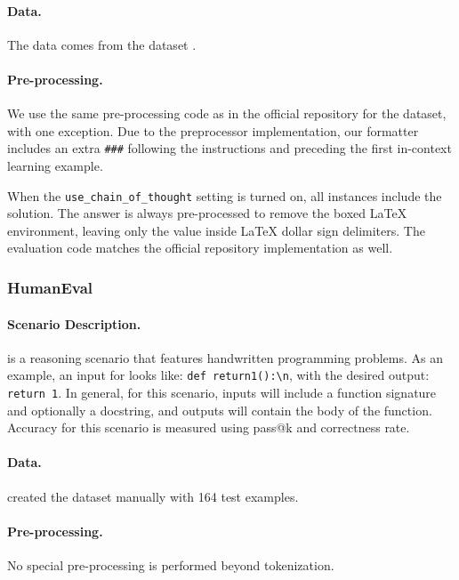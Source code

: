 \paragraph{Data.} The data comes from the \MATH dataset \citep{hendrycksmath2021}.

\paragraph{Pre-processing.} We use the same pre-processing code as in the official repository for the dataset, with one exception. Due to the preprocessor implementation, our formatter includes an extra \texttt{\#\#\#} following the instructions and preceding the first in-context learning example. 

When the \texttt{use\_chain\_of\_thought} setting is turned on, all instances include the solution. The answer is always pre-processed to remove the boxed LaTeX environment, leaving only the value inside LaTeX dollar sign delimiters.
The evaluation code matches the official repository implementation as well.

\subsubsection{HumanEval}
\paragraph{Scenario Description.}
\humaneval \citep{chen2021codex} is a reasoning scenario that features handwritten programming problems. 
As an example, an input for \humaneval looks like: 
\texttt{def return1():\textbackslash n}, with the desired output: \texttt{return 1}. 
In general, for this scenario, inputs will include a function signature and optionally a docstring, and outputs will contain the body of the function. 
Accuracy for this scenario is measured using pass@k and correctness rate.

\paragraph{Data.}
\citet{chen2021codex} created the dataset manually with 164 test examples. 


\paragraph{Pre-processing.}
No special pre-processing is performed beyond tokenization.

